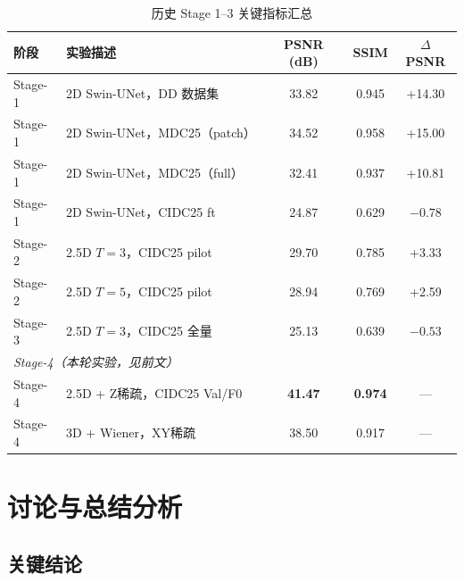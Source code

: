 \documentclass[UTF8, scheme=plain, 11pt, a4paper]{ctexart}
\begin{document}
\begin{table}[H]
  \centering
  \caption{历史 Stage 1--3 关键指标汇总}
  \label{tab:historical}
  \begin{tabular}{llccc}
    \toprule
    阶段 & 实验描述 & PSNR (dB) & SSIM & $\Delta$PSNR \\
    \midrule
    Stage-1 & 2D Swin-UNet，DD 数据集 & 33.82 & 0.945 & +14.30 \\
    Stage-1 & 2D Swin-UNet，MDC25（patch） & 34.52 & 0.958 & +15.00 \\
    Stage-1 & 2D Swin-UNet，MDC25（full） & 32.41 & 0.937 & +10.81 \\
    Stage-1 & 2D Swin-UNet，CIDC25 ft & 24.87 & 0.629 & $-0.78$ \\
    Stage-2 & 2.5D $T=3$，CIDC25 pilot & 29.70 & 0.785 & +3.33 \\
    Stage-2 & 2.5D $T=5$，CIDC25 pilot & 28.94 & 0.769 & +2.59 \\
    Stage-3 & 2.5D $T=3$，CIDC25 全量 & 25.13 & 0.639 & $-0.53$ \\
    \midrule
    \multicolumn{5}{l}{\textit{Stage-4（本轮实验，见前文）}} \\
    Stage-4 & 2.5D + Z稀疏，CIDC25 Val/F0 & \textbf{41.47} & \textbf{0.974} & --- \\
    Stage-4 & 3D + Wiener，XY稀疏 & 38.50 & 0.917 & --- \\
    \bottomrule
  \end{tabular}
\end{table}

\section{讨论与总结分析}

\subsection{关键结论}
\end{document}
